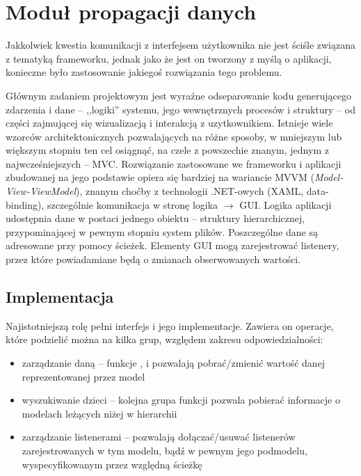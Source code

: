 \chapter{Moduł propagacji danych}

Jakkolwiek kwestia komunikacji z interfejsem użytkownika nie jest ściśle związana z tematyką
frameworku, jednak jako że jest on tworzony z myślą o aplikacji, konieczne było zastosowanie
jakiegoś rozwiązania tego problemu. 

Głównym zadaniem projektowym jest wyraźne odseparowanie kodu generującego zdarzenia i dane --
,,logiki'' systemu, jego wewnętrznych procesów i struktury -- od części zajmującej się wizualizacją
i interakcją z uzytkownikiem. Istnieje wiele wzorców architektonicznych pozwalających na różne
sposoby, w mniejszym lub większym stopniu ten cel osiągnąć, na czele z powszechie znanym, jednym z
najwcześniejszych -- MVC. Rozwiązanie zastosowane we frameworku i aplikacji zbudowanej na jego
podstawie opiera się bardziej na wariancie MVVM (\textit{Model-View-ViewModel}), znanym choćby z
technologii .NET-owych (XAML, data-binding), szczególnie komunikacja w stronę logika $\to$ GUI.
Logika aplikacji udostępnia dane w postaci jednego obiektu -- struktury hierarchicznej,
przypominającej w pewnym stopniu system plików. Poszczególne dane są adresowane przy pomocy ścieżek.
Elementy GUI mogą zarejestrować listenery, przez które powiadamiane będą o zmianach obserwowanych
wartości.


\section{Implementacja}


Najistotniejszą rolę pełni interfejs  i jego implementacje. Zawiera on operacje, które
podzielić można na kilka grup, względem zakresu odpowiedzialności:

\begin{itemize}

  \item zarządzanie daną -- funkcje ,  i  pozwalają
    pobrać\slash zmienić wartość danej reprezentowanej przez model

  \item wyszukiwanie dzieci -- kolejna grupa funkcji pozwala pobierać informacje o modelach leżących
    niżej w hierarchii

  \item zarządzanie listenerami -- pozwalają dołączać\slash usuwać listenerów zarejestrowanych w tym
    modelu, bądź w pewnym jego podmodelu, wyspecyfikowanym przez względną ścieżkę

\end{itemize}

